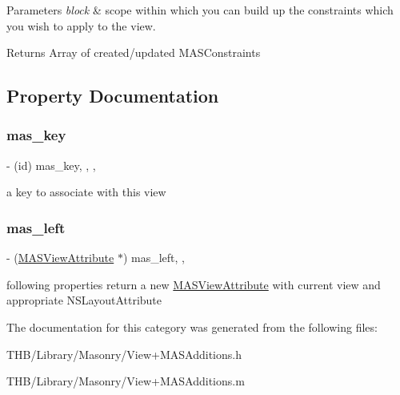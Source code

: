 \begin{DoxyParams}{Parameters}
{\em block} & scope within which you can build up the constraints which you wish to apply to the view.\\
\hline
\end{DoxyParams}
\begin{DoxyReturn}{Returns}
Array of created/updated M\+A\+S\+Constraints 
\end{DoxyReturn}


\subsection{Property Documentation}
\mbox{\label{category_m_a_s___v_i_e_w_07_m_a_s_additions_08_a1e51b750fbe051f1fd163a30c3ec3707}} 
\subsubsection{\texorpdfstring{mas\+\_\+key}{mas\_key}}
{\footnotesize\ttfamily -\/ (id) mas\+\_\+key\hspace{0.3cm}{\ttfamily [read]}, {\ttfamily [write]}, {\ttfamily [nonatomic]}, {\ttfamily [strong]}}

a key to associate with this view \mbox{\label{category_m_a_s___v_i_e_w_07_m_a_s_additions_08_a9baa6faaf337844837626c298fcfc143}} 
\subsubsection{\texorpdfstring{mas\+\_\+left}{mas\_left}}
{\footnotesize\ttfamily -\/ (\mbox{\hyperlink{interface_m_a_s_view_attribute}{M\+A\+S\+View\+Attribute}} $\ast$) mas\+\_\+left\hspace{0.3cm}{\ttfamily [read]}, {\ttfamily [nonatomic]}, {\ttfamily [strong]}}

following properties return a new \mbox{\hyperlink{interface_m_a_s_view_attribute}{M\+A\+S\+View\+Attribute}} with current view and appropriate N\+S\+Layout\+Attribute 

The documentation for this category was generated from the following files\+:\begin{DoxyCompactItemize}
\item 
T\+H\+B/\+Library/\+Masonry/View+\+M\+A\+S\+Additions.\+h\item 
T\+H\+B/\+Library/\+Masonry/View+\+M\+A\+S\+Additions.\+m\end{DoxyCompactItemize}

